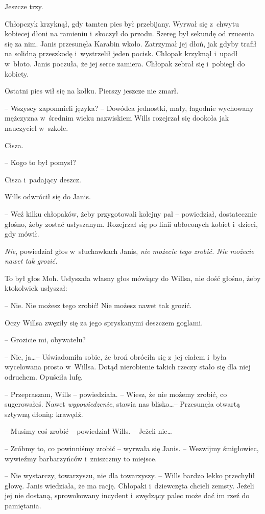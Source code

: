 \documentclass[oneside,polish,11pt,sfheadings]{mwbk}
\begin{document}
Jeszcze trzy.

Chłopczyk krzyknął, gdy tamten pies był przebijany. Wyrwał się z~chwytu
kobiecej dłoni na ramieniu i~skoczył do przodu. Szereg był sekundę od
rzucenia się za nim. Janis przesunęła Karabin wkoło. Zatrzymał jej dłoń,
jak gdyby trafił na solidną przeszkodę i~wystrzelił jeden pocisk.
Chłopak krzyknął i~upadł w~błoto. Janis poczuła, że jej serce zamiera.
Chłopak zebrał się i~pobiegł do kobiety.

Ostatni pies wił się na kołku. Pierszy jeszcze nie zmarł.

-- Wszyscy zapomnieli języka? -- Dowódca jednostki, mały, łagodnie
wychowany mężczyzna w~średnim wieku nazwiskiem Wills rozejrzał się
dookoła jak nauczyciel w~szkole.

Cisza.

-- Kogo to był pomysł?

Cisza i~padający deszcz.

Wills odwrócił się do Janis.

-- Weź kilku chłopaków, żeby przygotowali kolejny pal -- powiedział,
dostatecznie głośno, żeby zostać usłyszanym. Rozejrzał się po linii
ubłoconych kobiet i~dzieci, gdy mówił.

\emph{Nie}, powiedział głos w~słuchawkach Janis, \emph{nie możecie tego
zrobić. Nie możecie nawet tak grozić.}

To był głos Moh. Usłyszała własny głos mówiący do Willsa, nie dość
głośno, żeby ktokolwiek usłyszał: 

-- Nie. Nie możesz tego zrobić! Nie
możesz nawet tak grozić.

Oczy Willsa zwęziły się za jego spryskanymi deszczem goglami.

-- Grozicie mi, obywatelu?

-- Nie, ja\ldots -- Uświadomiła sobie, że broń obróciła się z~jej ciałem i~była wycelowana prosto w~Willsa. Dotąd nierobienie takich rzeczy stało
się dla niej odruchem. Opuściła lufę. 

-- Przepraszam, Wills -- powiedziała.
-- Wiesz, że nie możemy zrobić, co sugerowałeś. Nawet
\emph{wypowiedzenie}, stawia nas blisko\ldots -- Przesunęła otwartą sztywną
dłonią: krawędź.

-- Musimy coś zrobić -- powiedział Wills. -- Jeżeli nie\ldots

-- Zróbmy to, co powinniśmy zrobić -- wyrwała się Janis. -- Wezwijmy
śmigłowiec, wywieźmy barbarzyńców i~zniszczmy to miejsce.

-- Nie wystarczy, towarzyszu, nie dla towarzyszy. -- Wills bardzo lekko
przechylił głowę. Janis wiedziała, że ma rację. Chłopaki i~dziewczęta
chcieli zemsty. Jeżeli jej nie dostaną, sprowokowany incydent i~swędzący
palec może dać im rzeź do pamiętania.
\end{document}
